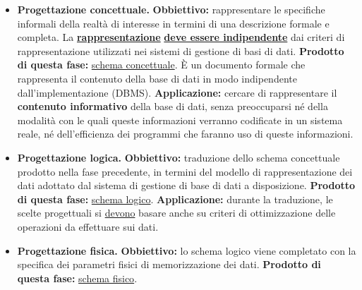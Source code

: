 \documentclass[a4paper]{article}
\begin{document}
	\begin{itemize}
		\item[\ding{42}] \textbf{Progettazione concettuale.}\newline
		\textcolor{Red3}{\textbf{Obbiettivo:}} rappresentare le specifiche informali della realtà di interesse in termini di una descrizione formale e completa. La \textbf{\underline{rappresentazione}} \textbf{\underline{deve essere indipendente}} dai criteri di rappresentazione utilizzati nei sistemi di gestione di basi di dati.\newline
		\textcolor{Green4}{\textbf{Prodotto di questa fase:}} \underline{schema concettuale}. È un documento formale che rappresenta il contenuto della base di dati in modo indipendente dall'implementazione (DBMS).\newline
		\textcolor{Blue3}{\textbf{Applicazione:}} cercare di rappresentare il \textbf{contenuto informativo} della base di dati, senza preoccuparsi né della modalità con le quali queste informazioni verranno codificate in un sistema reale, né dell'efficienza dei programmi che faranno uso di queste informazioni.\label{progettazione concettuale}
		
		\item[\ding{42}] \textbf{Progettazione logica.}\newline
		\textcolor{Red3}{\textbf{Obbiettivo:}} traduzione dello schema concettuale prodotto nella fase precedente, in termini del modello di rappresentazione dei dati adottato dal sistema di gestione di base di dati a disposizione.\newline
		\textcolor{Green4}{\textbf{Prodotto di questa fase:}} \underline{schema logico}.\newline
		\textcolor{Blue3}{\textbf{Applicazione:}} durante la traduzione, le scelte progettuali si \underline{devono} basare anche su criteri di ottimizzazione delle operazioni da effettuare sui dati.\label{progettazione logica}
		
		\item[\ding{42}] \textbf{Progettazione fisica.}\newline
		\textcolor{Red3}{\textbf{Obbiettivo:}} lo schema logico viene completato con la specifica dei parametri fisici di memorizzazione dei dati.\newline
		\textcolor{Green4}{\textbf{Prodotto di questa fase:}} \underline{schema fisico}.\newline\label{progettazione fisica}
	\end{itemize}
\end{document}

